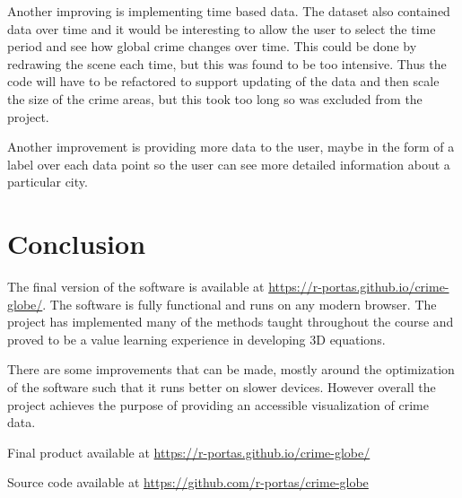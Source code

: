 \documentclass[]{article}
\begin{document}
Another improving is implementing time based data.
The dataset also contained data over time and it would be
interesting to allow the user to select the time period and see how global crime changes over time.
This could be done by redrawing the scene each time, but this was found to be too intensive.
Thus the code will have to be refactored to support updating of the data and then scale the size
of the crime areas, but this took too long so was excluded from the project.

Another improvement is providing more data to the user, maybe in the form of a label over each
data point so the user can see more detailed information about a particular city.

\section{Conclusion}

The final version of the software is available at \url{https://r-portas.github.io/crime-globe/}.
The software is fully functional and runs on any modern browser.
The project has implemented many of the methods taught throughout the course
and proved to be a value learning experience in developing 3D equations.

There are some improvements that can be made, mostly around the optimization of the software 
such that it runs better on slower devices.
However overall the project achieves the purpose of providing an accessible visualization of crime data.

\break

\begin{large}
    \begin{center}
        Final product available at \url{https://r-portas.github.io/crime-globe/}

        Source code available at \url{https://github.com/r-portas/crime-globe}
    \end{center}
\end{large}
\end{document}
